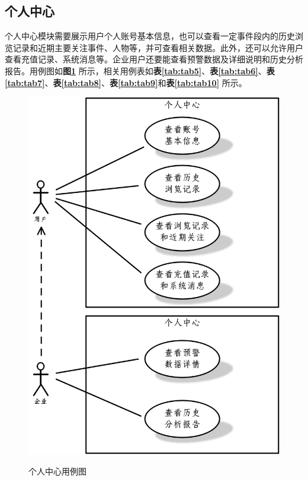 \subsection{个人中心}

个人中心模块需要展示用户个人账号基本信息，也可以查看一定事件段内的历史浏览记录和近期主要关注事件、人物等，并可查看相关数据。此外，还可以允许用户查看充值记录、系统消息等。企业用户还要能查看预警数据及详细说明和历史分析报告。用例图如\textbf{图\ref{fig:fig2}} 所示，相关用例表如\textbf{表\ref{tab:tab5}}、\textbf{表\ref{tab:tab6}}、\textbf{表\ref{tab:tab7}}、\textbf{表\ref{tab:tab8}}、\textbf{表\ref{tab:tab9}}和\textbf{表\ref{tab:tab10}}  所示。

\newpage
\begin{figure}[!htb]
	\centering\label{fig:fig2}
	\includegraphics[scale=0.5]{image/f2.png}
	\caption{个人中心用例图}
\end{figure}

